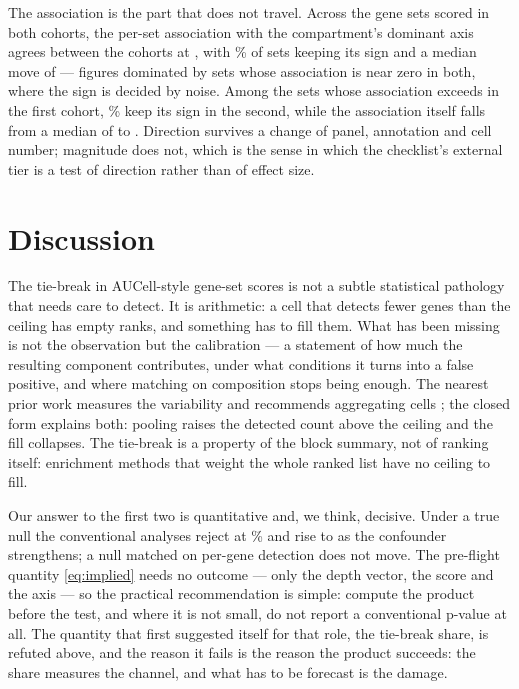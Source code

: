\documentclass[11pt]{article}
\begin{document}
The association is the part that does not travel. Across the
\benchCohortSets{} gene sets scored in both cohorts, the per-set association
with the compartment's dominant axis agrees between the cohorts at
\benchCohortRhoAcross, with \benchCohortSign{}\% of sets keeping its sign and a
median move of \benchCohortShift{} --- figures dominated by sets whose association
is near zero in both, where the sign is decided by noise. Among the
\benchCohortStrongN{} sets whose association exceeds \benchCohortStrongCut{} in
the first cohort, \benchCohortStrongSign{}\% keep its sign in the second, while the
association itself falls from a median of \benchCohortStrongFirst{} to
\benchCohortStrongSecond. Direction survives a change of panel, annotation and
cell number; magnitude does not, which is the sense in which the checklist's
external tier is a test of direction rather than of effect size.

\section{Discussion}

The tie-break in AUCell-style gene-set scores is not a subtle statistical
pathology that needs care to detect. It is arithmetic: a cell that detects fewer
genes than the ceiling has empty ranks, and something has to fill them. What has
been missing is not the observation but the calibration --- a statement of how
much the resulting component contributes, under what conditions it turns into a
false positive, and where matching on composition stops being enough. The
nearest prior work measures the variability and recommends aggregating cells
\citep{wenzel2024}; the closed form explains
both: pooling raises the detected count above the ceiling and the fill
collapses. The tie-break is a property of the block summary, not of ranking
itself: enrichment methods that weight the whole ranked list
\citep{subramanian2005,alvarez2016} have no ceiling to fill.

Our answer to the first two is quantitative and, we think, decisive. Under a
true null the conventional analyses reject at \cellcorPct\%{} and rise to
\confCCellcor{} as the confounder strengthens; a null matched on per-gene
detection does not move. The pre-flight quantity \eqref{eq:implied} needs no
outcome --- only the depth vector, the score and the axis --- so the practical
recommendation is simple: compute the
product before the test, and where it is not small, do not report a conventional
p-value at all. The quantity that first suggested itself for that role, the
tie-break share, is refuted above, and the reason it fails is
the reason the product succeeds: the share measures the channel, and what has to
be forecast is the damage.
\end{document}
